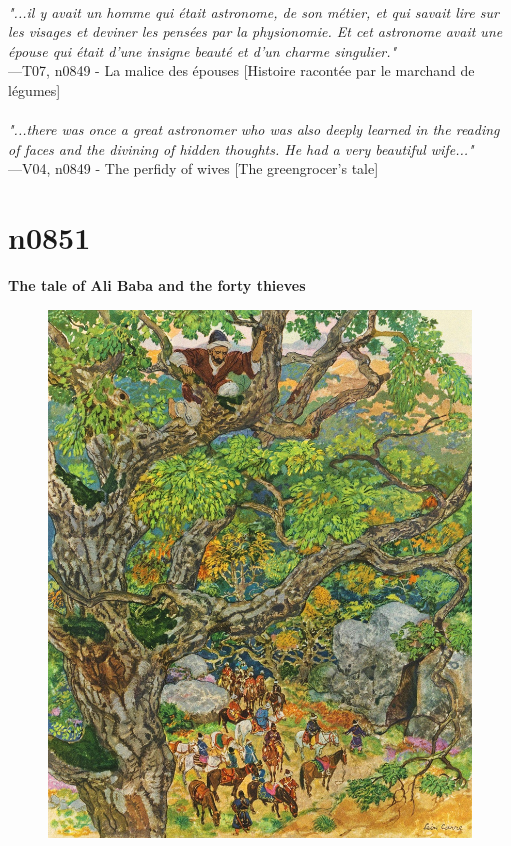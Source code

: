 \documentclass[../Carre_nights.tex]{subfiles}
\begin{document}
\textit{\\
"...il y avait un homme qui était astronome, de son métier, et qui savait lire sur les visages et deviner les pensées par la physionomie. Et cet astronome avait une épouse qui était d’une insigne beauté et d’un charme singulier."} \\
—T07, n0849 - La malice des épouses [Histoire racontée par le marchand de légumes] \\~\\
\textit{"...there was once a great astronomer who was also deeply learned in the reading of faces and the divining of hidden thoughts. He had a very beautiful wife..."} \\
—V04, n0849 - The perfidy of wives [The greengrocer’s tale]

\newpage

\section{n0851}
\textbf{\Large{The tale of Ali Baba and the forty thieves}} \\

\begin{figure}[ht]
\centering
\includegraphics[height=\figsize]{illustrations/volume_7/T07, n0851 - Histoire d'Ali Baba et des quarante voleurs.jpg}
\end{figure}
\end{document}
